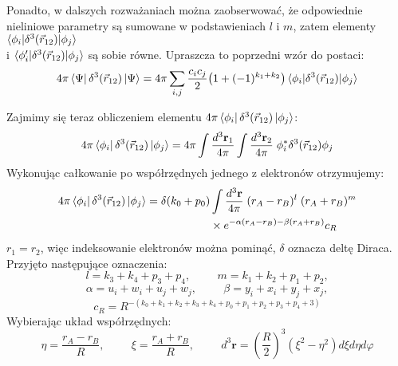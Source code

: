 \documentclass[a4paper,12pt]{article}
\numberwithin{equation}{section}
\numberwithin{table}{section}
\numberwithin{figure}{section}
\begin{document}
Ponadto, w dalszych rozważaniach można zaobserwować, że odpowiednie nieliniowe parametry są sumowane w podstawieniach $l$ i $m$, zatem elementy $\braket{\phi_i |\delta^3(\vec{r}_{12})| \phi_j}$\\ i $\braket{\phi'_i |\delta^3(\vec{r}_{12})| \phi_j}$ są sobie równe. Upraszcza to poprzedni wzór do postaci:
 \begin{equation}
4\pi \bra{\Psi}\delta^3(\vec{r}_{12})\ket{\Psi} = 4 \pi \sum_{i,j} \frac{c_i c_j}{2}\big( 1 + (-1)^{k_1+k_2}\big) \braket{\phi_i |\delta^3(\vec{r}_{12})| \phi_j}
\end{equation}

Zajmimy się teraz obliczeniem elementu $4\pi\bra{\phi_i}\delta^3(\vec{r}_{12})\ket{\phi_j}$:
\begin{equation}
4\pi\bra{\phi_i}\delta^3(\vec{r}_{12})\ket{\phi_j} = 4\pi \int \frac{d^3\mathbf{r}_1}{4\pi} \int \frac{d^3\mathbf{r}_2}{4\pi} \; \phi_i^* \delta^3(\vec{r}_{12}) \phi_j
\end{equation}
Wykonując całkowanie po współrzędnych jednego z elektronów otrzymujemy:
\begin{equation}
\begin{split}
4\pi\bra{\phi_i}\delta^3(\vec{r}_{12})\ket{\phi_j} = \delta(k_0 + p_0) & \int \frac{d^3\mathbf{r}}{4\pi} \; (r_A - r_B)^{l}\;(r_A + r_B)^{m}\\
 & \times{} e^{
-\alpha(r_A-r_B)-\beta(r_A+r_B)
} c_R
\end{split}
\end{equation}
 $r_1 = r_2$, więc indeksowanie elektronów można pominąć, $\delta$ oznacza deltę Diraca. Przyjęto następujące oznaczenia:
\begin{equation*}
l=k_{3}+k_{4}+p_{3}+p_{4},
\hspace{1cm} m = k_{1}+k_{2}+p_{1}+p_{2},
\end{equation*}
\begin{equation*}
\alpha = u_i+w_i+u_j+w_j,
\hspace{1cm}\beta =y_i+x_i+y_j+x_j,
\end{equation*}
\begin{equation*}
c_R =  R^{-(k_{0}+k_{1}+k_{2}+k_{3}+k_{4}+p_{0}+p_{1}+p_{2}+p_{3}+p_{4}+3)}
\end{equation*}
Wybierając układ współrzędnych:
\begin{equation} \label{eq:xieta}
\eta = \frac{r_A-r_B}{R},
\hspace{1cm}\xi = \frac{r_A+r_B}{R}, 
\hspace{1cm} d^3 \mathbf{r} = \left( \frac{R}{2} \right)^3(\xi^2 - \eta^2) d\xi d\eta d\varphi
\end{equation}
\end{document}
